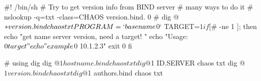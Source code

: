 #! /bin/sh
# Try to get version info from BIND server
# many ways to do it
# nslookup -q=txt -class=CHAOS version.bind. 0
# dig @$* version.bind chaos txt
PROGRAM=`basename $0`
TARGET=$1

if [ $# -ne 1 ]; then
   echo "get name server version, need a target! "
   echo "Usage: $0 target"
   echo "example $0 10.1.2.3"
   exit 0
fi

# using dig 
dig @$1 hostname.bind chaos txt
dig @$1 ID.SERVER chaos txt
dig @$1 version.bind chaos txt
dig @$1 authors.bind chaos txt
